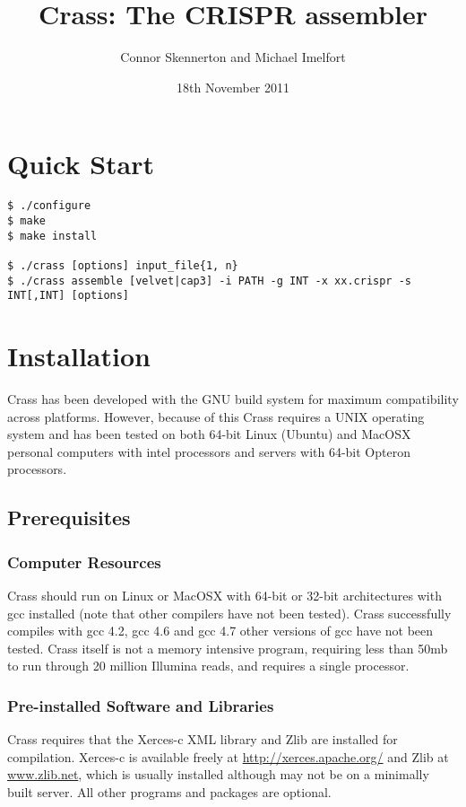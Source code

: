 \documentclass[11pt]{article} %
\title{Crass:  The CRISPR assembler}
\author{Connor Skennerton and Michael Imelfort}
\date{18th November 2011} %
\begin{document}
\maketitle

\tableofcontents
\section{Quick Start}
\begin{lstlisting}[basicstyle=\footnotesize]
$ ./configure
$ make
$ make install

$ ./crass [options] input_file{1, n}
$ ./crass assemble [velvet|cap3] -i PATH -g INT -x xx.crispr -s INT[,INT] [options]
\end{lstlisting}
\section{Installation}
Crass has been developed with the GNU build system for maximum compatibility across platforms.  However, because of this Crass requires a UNIX operating system and has been tested on both 64-bit Linux (Ubuntu) and MacOSX personal computers with intel processors and servers with 64-bit Opteron processors.
\subsection{Prerequisites}
\subsubsection{Computer Resources}
Crass should run on Linux or MacOSX with 64-bit or 32-bit architectures with gcc installed (note that other compilers have not been tested).  Crass successfully compiles with gcc 4.2, gcc 4.6 and gcc 4.7 other versions of gcc have not been tested.  Crass itself is not a memory intensive program, requiring less than 50mb to run through 20 million Illumina reads, and requires a single processor.  

\subsubsection{Pre-installed Software and Libraries}
Crass requires that the Xerces-c XML library  and Zlib are installed for compilation.  Xerces-c is available freely at \url{http://xerces.apache.org/} and Zlib at \url{www.zlib.net}, which is usually installed although may not be on a minimally built server.  All other programs and packages are optional.
\end{document}

